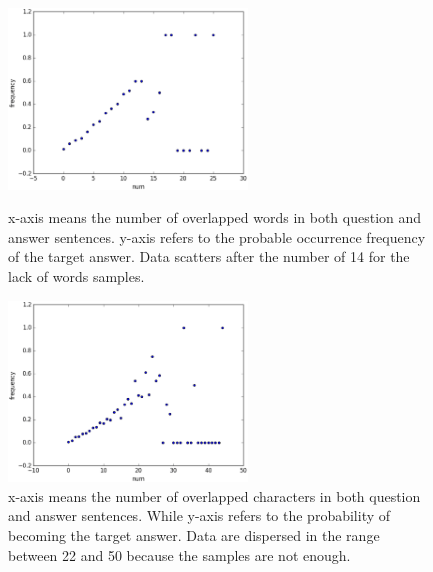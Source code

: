 \documentclass{llncs}
\begin{document}
\begin{figure}[htb]
	\begin{minipage}[t]{0.5\linewidth} 
	\subfigure

		\includegraphics[width=2.5in]{figures/word_overlap.eps}
		\caption{x-axis means the number of overlapped words in both question and answer sentences. y-axis refers to the probable occurrence frequency of the target answer. Data scatters after the number of 14 for the lack of words samples.}
		\label{fig:word_overlap}
	\end{minipage}
	\hspace{1ex} 
	\begin{minipage}[t]{0.5\linewidth} 
	\subfigure
	\centering
		\includegraphics[width=2.5in]{figures/character_overlap.eps}
		\caption{x-axis means the number of overlapped characters in both question and answer sentences. While y-axis refers to the probability of becoming the target answer. Data are dispersed in the range between 22 and 50 because the samples are not enough.}
		\label{fig:character_overlap}
	\end{minipage}
\end{figure}

\end{document}

